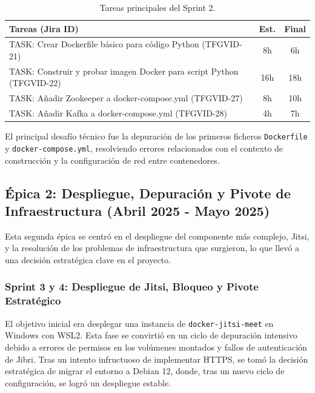 \begin{table}[H]
    \centering
    \begin{tabular}{|p{}|c|c|}
        \hline
        \rowcolor[HTML]{EFEFEF} 
        \textbf{Tareas (Jira ID)} & \textbf{Est.} & \textbf{Final} \\ \hline
        \rowcolor[HTML]{ECF4FF} 
        TASK: Crear Dockerfile básico para código Python (TFGVID-21) & 8h & 6h \\
        \rowcolor[HTML]{EFEFEF} 
        TASK: Construir y probar imagen Docker para script Python (TFGVID-22) & 16h & 18h \\
        \rowcolor[HTML]{ECF4FF} 
        TASK: Añadir Zookeeper a docker-compose.yml (TFGVID-27) & 8h & 10h \\
        \rowcolor[HTML]{EFEFEF} 
        TASK: Añadir Kafka a docker-compose.yml (TFGVID-28) & 4h & 7h \\
        \hline
    \end{tabular}
    \caption{Tareas principales del Sprint 2.}
    \label{tab:sprint2}
\end{table}

El principal desafío técnico fue la depuración de los primeros ficheros \texttt{Dockerfile} y \texttt{docker-compose.yml}, resolviendo errores relacionados con el contexto de construcción y la configuración de red entre contenedores.

\subsection{Épica 2: Despliegue, Depuración y Pivote de Infraestructura (Abril 2025 - Mayo 2025)}
\label{epic:2}
Esta segunda épica se centró en el despliegue del componente más complejo, Jitsi, y la resolución de los problemas de infraestructura que surgieron, lo que llevó a una decisión estratégica clave en el proyecto.

\subsubsection{Sprint 3 y 4: Despliegue de Jitsi, Bloqueo y Pivote Estratégico}
El objetivo inicial era desplegar una instancia de \texttt{docker-jitsi-meet} en Windows con WSL2. Esta fase se convirtió en un ciclo de depuración intensivo debido a errores de permisos en los volúmenes montados y fallos de autenticación de Jibri. Tras un intento infructuoso de implementar HTTPS, se tomó la decisión estratégica de migrar el entorno a Debian 12, donde, tras un nuevo ciclo de configuración, se logró un despliegue estable.

